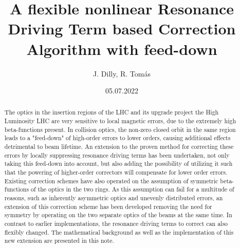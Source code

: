\documentclass[dvipsnames]{simplenote}    %
\date{05.07.2022}
\title{A flexible nonlinear Resonance Driving Term based Correction Algorithm with feed-down}
\author{J. Dilly, R. Tom\'as}
\begin{document}
\graphicspath{
    {./images/}
}
\maketitle 

\begin{abstract}
The optics in the insertion regions of the LHC and its upgrade project the High Luminosity LHC are very sensitive to local magnetic errors, 
due to the extremely high beta-functions present.
In collision optics, the non-zero closed orbit in the same region leads to a "feed-down" of high-order errors to lower orders, 
causing additional effects detrimental to beam lifetime. 
An extension to the proven method for correcting these errors by locally suppressing resonance driving terms has been undertaken, 
not only taking this feed-down into account, but also adding the possibility of utilizing it such that the powering of higher-order correctors will compensate 
for lower order errors.
Existing correction schemes have also operated on the assumption of symmetric beta-functions of the optics in the two rings.
As this assumption can fail for a multitude of reasons, such as inherently asymmetric optics and unevenly distributed errors, 
an extension of this correction scheme has been developed removing the need for symmetry by operating on the two separate optics of the beams at the same time.
In contrast to earlier implementations, the resonance driving terms to correct can also flexibly changed. 
The mathematical background as well as the implementation of this new extension are presented in this note.
\end{abstract}


\tableofcontents
\newpage





\FloatBarrier


\FloatBarrier


\FloatBarrier


\FloatBarrier


\FloatBarrier



\clearpage

\FloatBarrier

\end{document}
